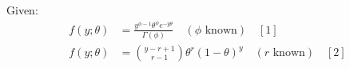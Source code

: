 \documentclass[a4paper]{article}
\begin{document}



\section{}
    Given:
        \begin{equation*}
            \begin{split}
                f(y;\theta) &= \frac{y^{\phi-1} \theta^\phi e^{-y\theta}}{\Gamma(\phi)} \quad (\phi \text{ known}) \quad [1]\\
                f(y;\theta) &= {{y-r+1}\choose{r-1}} \theta^r (1-\theta)^y \quad (r \text{ known}) \quad [2]
            \end{split}
        \end{equation*}
\end{document}
